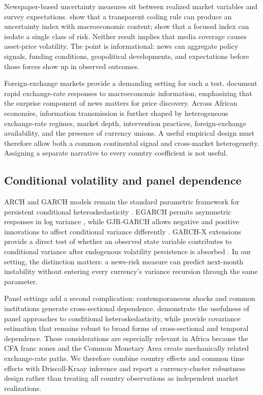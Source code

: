 \documentclass[11pt]{article}
\begin{document}
Newspaper-based uncertainty measures sit between realized market
variables and survey expectations. \citet{baker2016} show that a
transparent coding rule can produce an uncertainty index with
macroeconomic content; \citet{caldara2022} show that a focused index can
isolate a single class of risk. Neither result implies that media
coverage causes asset-price volatility. The point is informational: news
can aggregate policy signals, funding conditions, geopolitical
developments, and expectations before those forces show up in observed
outcomes.

Foreign-exchange markets provide a demanding setting for such a test.
\citet{andersen2003} document rapid exchange-rate responses to
macroeconomic information, emphasizing that the surprise component of
news matters for price discovery. Across African economies, information
transmission is further shaped by heterogeneous exchange-rate regimes,
market depth, intervention practices, foreign-exchange availability, and
the presence of currency unions. A useful empirical design must
therefore allow both a common continental signal and cross-market
heterogeneity. Assigning a separate narrative to every country
coefficient is not useful.

\subsection{Conditional volatility and panel
dependence}\label{conditional-volatility-and-panel-dependence}

ARCH and GARCH models remain the standard parametric framework for
persistent conditional heteroskedasticity \citep{engle1982,bollerslev1986}. EGARCH permits asymmetric responses in log variance \citep{nelson1991}, while GJR-GARCH allows negative and positive innovations to
affect conditional variance differently \citep{glosten1993}. GARCH-X extensions provide a direct test of whether an
observed state variable contributes to conditional variance after
endogenous volatility persistence is absorbed \citep{francq2019,pedersen2019}. In our setting, the distinction matters: a news-risk measure can
predict next-month instability without entering every currency's variance
recursion through the same parameter.

Panel settings add a second complication: contemporaneous shocks and
common institutions generate cross-sectional dependence. \citet{cermeno2006} demonstrate the usefulness of panel approaches to
conditional heteroskedasticity, while \citet{driscoll1998} provide
covariance estimation that remains robust to broad forms of
cross-sectional and temporal dependence. These considerations are
especially relevant in Africa because the CFA franc zones and the Common
Monetary Area create mechanically related exchange-rate paths. We
therefore combine country effects and common time effects with
Driscoll-Kraay inference and report a currency-cluster robustness design
rather than treating all country observations as independent market
realizations.
\end{document}

